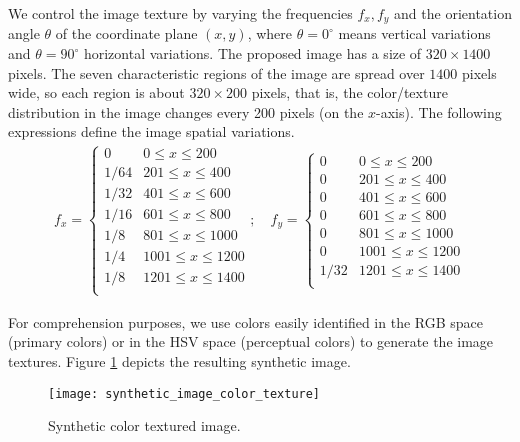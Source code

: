 We control the image texture by varying the frequencies $f_{x}, f_{y}$ and the orientation angle $\theta$ of the coordinate plane $(x, y)$, where $\theta=0^\circ$ means vertical variations and $\theta=90^\circ$ horizontal variations. The proposed image has a size of $320\times1400$ pixels. The seven characteristic regions of the image are spread over $1400$ pixels wide, so each region is about $320\times200$ pixels, that is, the color/texture distribution in the image changes every 200 pixels (on the $x$-axis). The following expressions define the image spatial variations.  
\begin{gather}
	f_{x} = 
	\begin{cases} 
      0    & 0\leq x\leq 200  \\
      1/64 & 201\leq x\leq 400  \\
      1/32 & 401\leq x\leq 600  \\
      1/16 & 601\leq x\leq 800  \\
      1/8  & 801\leq x\leq 1000  \\
      1/4  & 1001\leq x\leq 1200 \\   
      1/8  & 1201\leq x\leq 1400 \\ 
   	 \end{cases} \nonumber ; \quad
   	 f_{y} = \begin{cases} 
      0    & 0\leq x\leq 200  \\
      0    & 201\leq x\leq 400  \\
      0    & 401\leq x\leq 600  \\
      0    & 601\leq x\leq 800  \\
      0    & 801\leq x\leq 1000  \\
      0    & 1001\leq x\leq 1200 \\  
      1/32 & 1201\leq x\leq 1400 \\ 
   	 \end{cases} \nonumber  
\end{gather}

For comprehension purposes, we use colors easily identified in the RGB space (primary colors) or in the HSV space (perceptual colors) to generate the image textures. Figure \ref{fig:synthetic_color_texture_image} depicts the resulting synthetic image. 

\begin{figure}[!ht]
    \texttt{[image: synthetic\_image\_color\_texture]}
\caption{Synthetic color textured image.}\label{fig:synthetic_color_texture_image}
\end{figure}


